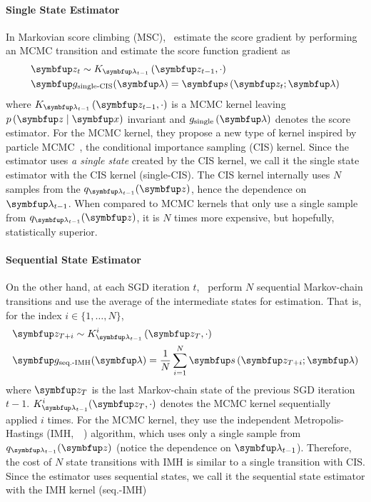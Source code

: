 \vspace{-0.05in}
\paragraph{Single State Estimator}
In Markovian score climbing (MSC),~\citet{NEURIPS2020_b2070693} estimate the score gradient by performing an MCMC transition and estimate the score function gradient as
\vspace{-0.05in}
\begin{align*}
  &\vz_t \sim K_{\vlambda_{t-1}}\left(\vz_{t-1}, \cdot \right) \\
  &\vg_{\text{single-CIS}}(\vlambda) = \vs\,(\vz_t; \vlambda)
\end{align*}
where \(K_{\vlambda_{t-1}}\left(\vz_{t-1}, \cdot\right)\) is a MCMC kernel leaving \(p\,(\vz\mid\vx)\) invariant and \(g_{\text{single}}\left(\vlambda\right)\) denotes the score estimator.
For the MCMC kernel, they propose a new type of kernel inspired by particle MCMC~\citep{andrieu_particle_2010, andrieu_uniform_2018}, the conditional importance sampling (CIS) kernel.
Since the estimator uses \textit{a single state} created by the CIS kernel, we call it the single state estimator with the CIS kernel (single-CIS).
The CIS kernel internally uses \(N\) samples from the \(q_{\vlambda_{t-1}}(\vz)\), hence the dependence on \(\vlambda_{t-1}\).
When compared to MCMC kernels that only use a single sample from \(q_{\vlambda_{t-1}}(\vz)\), it is \(N\) times more expensive, but hopefully, statistically superior.

\vspace{-0.08in}
\paragraph{Sequential State Estimator}
On the other hand, at each SGD iteration \(t\),~\citet{pmlr-v124-ou20a} perform \(N\) sequential Markov-chain transitions and use the average of the intermediate states for estimation.
That is, for the index \(i \in \{1, \ldots, N\}\),
\vspace{-0.05in}
\begin{align*}
  &\vz_{T+i} \sim K_{\vlambda_{t-1}}^i\left(\vz_{T}, \cdot \right) \\
  &\vg_{\text{seq.-IMH}}(\vlambda) = \frac{1}{N} \sum_{i=1}^N \vs\,(\vz_{T+i}; \vlambda)
\end{align*}
where \(\vz_T\) is the last Markov-chain state of the previous SGD iteration 
\(t-1\).
\(K^{i}_{\vlambda_{t-1}}(\vz_{T}, \cdot)\) denotes the MCMC kernel sequentially applied \(i\) times.
For the MCMC kernel, they use the independent Metropolis-Hastings (IMH,~\citealt[Algorithm 25]{robert_monte_2004}~\citealt{hastings_monte_1970}) algorithm, which uses only a single sample from \(q_{\vlambda_{t-1}}(\vz)\) (notice the dependence on \(\vlambda_{t-1}\)).
Therefore, the cost of \(N\) state transitions with IMH is similar to a single transition with CIS.
Since the estimator uses sequential states, we call it the sequential state estimator with the IMH kernel (seq.-IMH)

